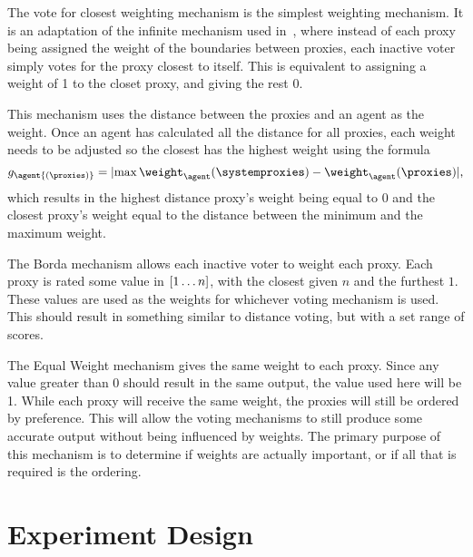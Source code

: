 \label{para:closest}
The vote for closest weighting mechanism is the simplest weighting mechanism.
It is an adaptation of the infinite mechanism used in~\cite{Cohensius2017},
where instead of each proxy being assigned the weight of the boundaries
between proxies, each inactive voter simply votes for the proxy closest to
itself.
This is equivalent to assigning a weight of 1 to the closet proxy, and giving
the rest 0.

\label{para:distance-voting}
This mechanism uses the distance between the proxies and an agent as the weight.
Once an agent has calculated all the distance for all proxies,
each weight needs to be adjusted so the closest has the highest weight using
the formula
\begin{equation}
    g_\agent{(\proxies)} = \lvert
    \max{\weight_{\agent}{(\systemproxies)}} - \weight_{\agent}{(\proxies)}
    \rvert
    \text{,}\label{eq:distance-voting-adjustment}
\end{equation}
which results in the highest distance proxy's weight being equal to 0 and the
closest proxy's weight equal to the distance between the minimum and the
maximum weight.

\label{para:borda}
The Borda mechanism allows each inactive voter to weight each proxy.
Each proxy is rated some value in $[1 \mathellipsis n]$, with the closest
given $n$ and the furthest $1$.
These values are used as the weights for whichever voting mechanism is used.
This should result in something similar to distance voting, but with a set
range of scores.

\label{para:equal-weight}
The Equal Weight mechanism gives the same weight to each proxy.
Since any value greater than 0 should result in the same output, the value used here
will be 1.
While each proxy will receive the same weight, the proxies will still be ordered by
preference.
This will allow the voting mechanisms to still produce some accurate output without
being influenced by weights.
The primary purpose of this mechanism is to determine if weights are actually
important, or if all that is required is the ordering.


\section{Experiment Design}\label{sec:experiment-design}
%
%

